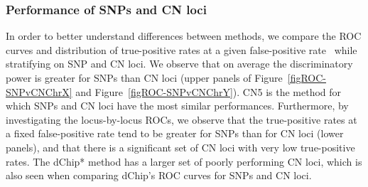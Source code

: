 \documentclass{bioinfo}
\newcommand{\TPrates}{true-positive rates\xspace}
\newcommand{\FPrate}{false-positive rate\xspace}
\begin{document}
\subsubsection{Performance of SNPs and CN loci}
In order to better understand differences between methods, we compare the ROC curves and distribution of \TPrates at a given \FPrate~\citep{BengtssonH_etal_2008} while stratifying on SNP and CN loci.
We observe that on average the discriminatory power is greater for SNPs than CN loci (upper panels of Figure~\ref{figROC-SNPvCNChrX} and Figure~\ref{figROC-SNPvCNChrY}).  CN5 is the method for which SNPs and CN loci have the most similar performances.   Furthermore, by investigating the locus-by-locus ROCs, we observe that the \TPrates at a fixed \FPrate tend to be greater for SNPs than for CN loci (lower panels), and that there is a significant set of CN loci with very low \TPrates.  The dChip* method has a larger set of poorly performing CN loci, which is also seen when comparing dChip's ROC curves for SNPs and CN loci.  
\end{document}
